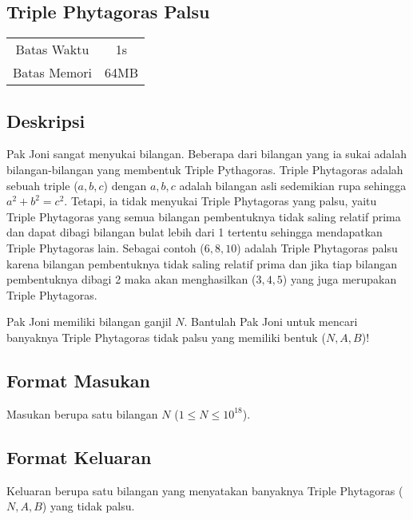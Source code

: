 \documentclass{article}
\begin{document}
\begin{center}
    \section*{Triple Phytagoras Palsu} %

    \begin{tabular}{ | c c | }
        \hline
        Batas Waktu  & 1s \\    %
        Batas Memori & 64MB \\  %
        \hline
    \end{tabular}
\end{center}

\subsection*{Deskripsi}

Pak Joni sangat menyukai bilangan. Beberapa dari bilangan yang ia sukai adalah 
bilangan-bilangan yang membentuk Triple Pythagoras. 
Triple Phytagoras adalah sebuah triple ($a, b, c$) dengan $a, b, c$ adalah bilangan asli sedemikian rupa sehingga 
$a^2 + b^2 = c^2$. Tetapi, ia tidak menyukai Triple Phytagoras yang palsu, yaitu Triple Phytagoras yang semua bilangan 
pembentuknya tidak saling relatif prima dan dapat dibagi bilangan bulat lebih dari 1 tertentu sehingga mendapatkan Triple Phytagoras lain. 
Sebagai contoh ($6, 8, 10$) adalah Triple Phytagoras palsu karena bilangan pembentuknya 
tidak saling relatif prima dan jika tiap bilangan pembentuknya dibagi 2 maka akan 
menghasilkan ($3, 4, 5$) yang juga merupakan Triple Phytagoras.

Pak Joni memiliki bilangan ganjil $N$. Bantulah Pak Joni untuk mencari banyaknya Triple Phytagoras tidak palsu yang memiliki bentuk ($N, A, B$)!


\subsection*{Format Masukan}

Masukan berupa satu bilangan $N$ ($1 \leq N \leq 10^{18}$).

\subsection*{Format Keluaran}

Keluaran berupa satu bilangan yang menyatakan banyaknya Triple Phytagoras ($N, A, B$) yang tidak palsu.
\\
\end{document}
